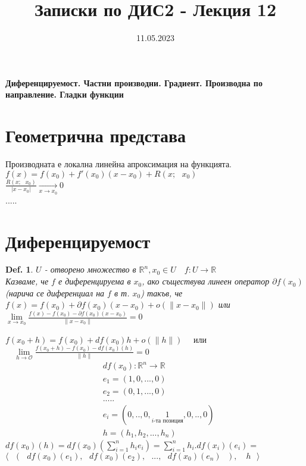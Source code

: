 \documentclass[12pt]{article}
\newtheorem{definition}{Def.}
\newcommand{\spc}{\text{ }}
\begin{document}
	\color{white}
	\pagecolor{darkgray}
	\title{Записки по ДИС2 - Лекция 12}
	\date{11.05.2023}
	\maketitle
	\begin{center}
		\Large
		\textbf{Диференцируемост. Частни производни. Градиент. Производна по направление. Гладки функции}
	\end{center}
	
	
	\section*{Геометрична представа}
	Производната е локална линейна апроксимация на функцията.\\
	$f(x) = f(x_0)+f'(x_0)(x-x_0)+R(x;\spc x_0)$\\
	$\frac{R(x;\spc x_0)}{|x-x_0|}\underset{x\to x_0}{\longrightarrow}0$\\
	$\spc$\\
	.....\\
	
	\section*{Диференцируемост}
	\begin{definition}
		$U$ - отворено множество в $\mathbb{R}^n, x_0\in U\quad f:U\rightarrow\mathbb{R}$\\
		Казваме, че $f$ е диференцируема в $x_0$, ако съществува линеен оператор $\partial f(x_0)$ (нарича се диференциал на $f$ в т. $x_0$) такъв, че \\
		$f(x)=f(x_0)+\partial f(x_0)(x-x_0)+o(\|x-x_0\|)$ или\\
		$\lim\limits_{x\to x_0}\frac{f(x)-f(x_0)-\partial f(x_0)(x-x_0)}{\|x-x_0\|}=0$
	\end{definition}
	$f(x_0 +h) = f(x_0) + df(x_0)h + o(\|h\|)\quad$ или 
	$\quad\lim\limits_{h\to\mathcal{O}}\frac{f(x_0 +h) - f(x_0) - df(x_0)(h)}{\|h\|} = 0$\\
	
	\begin{align*}
		&df(x_0) : \mathbb{R}^n \rightarrow \mathbb{R}\\
		&e_1 = (1,0,...,0)\\
		&e_2 = (0,1,...,0)\\
		&	.....\\
		&e_i = (0,..,0,\underset{i\text{-та позиция}}{1},0,..,0)\\
		&h = (h_1,h_2,...,h_n)
	\end{align*}
	$df(x_0)(h)=df(x_0)\left(\sum_{i=1}^{n}h_i e_i\right) = \sum_{i=1}^{n}h_i . df(x_i)(e_i) = $
	$\big\langle \spc (\spc df(x_0)(e_1),\spc df(x_0)(e_2),\spc...,\spc df(x_0)(e_n)\spc),\quad h\spc\big\rangle$
	
\end{document}
